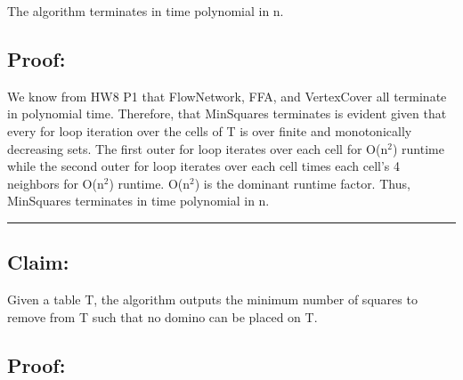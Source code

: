\documentclass[11pt]{article}
\begin{document}
The algorithm terminates in time polynomial in n. 

\subsection*{Proof:} 

We know from HW8 P1 that FlowNetwork, FFA, and VertexCover all terminate in polynomial time. Therefore, that MinSquares terminates is evident given that every for loop iteration over the cells of T is over finite and monotonically decreasing sets. The first outer for loop iterates over each cell for O(n$^2$) runtime while the second outer for loop iterates over each cell times each cell's 4 neighbors for O(n$^2$) runtime. O(n$^2$) is the dominant runtime factor. Thus, MinSquares terminates in time polynomial in n. 

\noindent\textcolor[RGB]{220,220,220}{\rule{\linewidth}{0.8pt}}

\subsection*{Claim:} 

Given a table T, the algorithm outputs the minimum number of squares to remove from T such that no domino can be placed on T. 

\subsection*{Proof:} 
\end{document}
